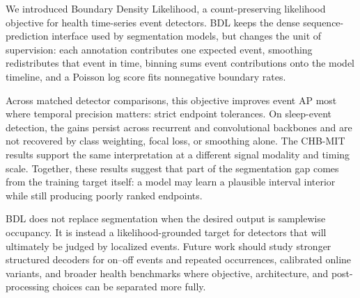 \documentclass{article}
\begin{document}
We introduced Boundary Density Likelihood, a count-preserving likelihood
objective for health time-series event detectors.
BDL keeps the dense sequence-prediction interface used by segmentation models,
but changes the unit of supervision: each annotation contributes one expected
event, smoothing redistributes that event in time, binning sums event
contributions onto the model timeline, and a Poisson log score fits
nonnegative boundary rates.

Across matched detector comparisons, this objective improves event AP most
where temporal precision matters: strict endpoint tolerances.
On sleep-event detection, the gains persist across recurrent and convolutional
backbones and are not recovered by class weighting, focal loss, or smoothing
alone.
The CHB-MIT results support the same interpretation at a different signal
modality and timing scale.
Together, these results suggest that part of the segmentation gap comes from
the training target itself: a model may learn a plausible interval interior
while still producing poorly ranked endpoints.

BDL does not replace segmentation when the desired output is samplewise
occupancy.
It is instead a likelihood-grounded target for detectors that will ultimately
be judged by localized events.
Future work should study stronger structured decoders for on--off events and
repeated occurrences, calibrated online variants, and broader health
benchmarks where objective, architecture, and post-processing choices can be
separated more fully.

\clearpage


\end{document}
